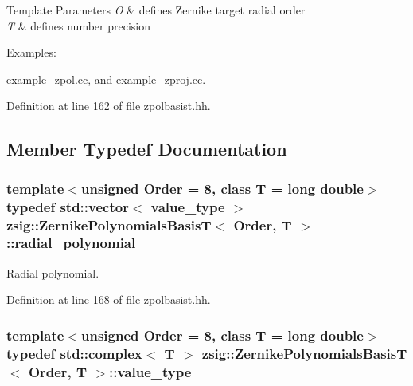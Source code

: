 \begin{DoxyTemplParams}{Template Parameters}
{\em O} & defines Zernike target radial order \\
\hline
{\em T} & defines number precision \\
\hline
\end{DoxyTemplParams}
\begin{Desc}
\item[Examples: ]\par


\hyperlink{example_zpol_8cc-example}{example\_\-zpol.cc}, and \hyperlink{example_zproj_8cc-example}{example\_\-zproj.cc}.

\end{Desc}


Definition at line 162 of file zpolbasist.hh.



\subsection{Member Typedef Documentation}
\hypertarget{classzsig_1_1ZernikePolynomialsBasisT_a4b199b40b343b7451c043c7375da5ee1}{
\subsubsection[{radial\_\-polynomial}]{\setlength{\rightskip}{0pt plus 5cm}template$<$unsigned Order = 8, class T = long double$>$ typedef std::vector$<$ {\bf value\_\-type} $>$ {\bf zsig::ZernikePolynomialsBasisT}$<$ Order, T $>$::{\bf radial\_\-polynomial}}}
\label{classzsig_1_1ZernikePolynomialsBasisT_a4b199b40b343b7451c043c7375da5ee1}


Radial polynomial. 



Definition at line 168 of file zpolbasist.hh.

\hypertarget{classzsig_1_1ZernikePolynomialsBasisT_ab95fd66256ec93a9cbeafc4304362a59}{
\subsubsection[{value\_\-type}]{\setlength{\rightskip}{0pt plus 5cm}template$<$unsigned Order = 8, class T = long double$>$ typedef std::complex$<$ T $>$ {\bf zsig::ZernikePolynomialsBasisT}$<$ Order, T $>$::{\bf value\_\-type}}}
\label{classzsig_1_1ZernikePolynomialsBasisT_ab95fd66256ec93a9cbeafc4304362a59}


